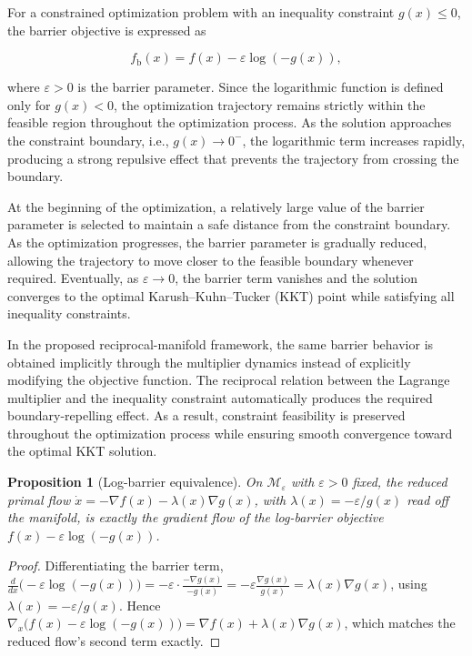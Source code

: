 \documentclass[11pt,onecolumn]{article}
\newtheorem{proposition}[theorem]{Proposition}
\theoremstyle{definition}
\theoremstyle{remark}
\newcommand{\Mveps}{\mathcal{M}_\varepsilon}
\begin{document}
For a constrained optimization problem with an inequality constraint $g(x)\le0$, the barrier objective is expressed as

\begin{equation}
f_{\mathrm{b}}(x)=f(x)-\varepsilon\log\!\left(-g(x)\right),
\label{eq:log_barrier}
\end{equation}

where $\varepsilon>0$ is the barrier parameter. Since the logarithmic function is defined only for $g(x)<0$, the optimization trajectory remains strictly within the feasible region throughout the optimization process. As the solution approaches the constraint boundary, i.e., $g(x)\rightarrow0^{-}$, the logarithmic term increases rapidly, producing a strong repulsive effect that prevents the trajectory from crossing the boundary.

At the beginning of the optimization, a relatively large value of the barrier parameter is selected to maintain a safe distance from the constraint boundary. As the optimization progresses, the barrier parameter is gradually reduced, allowing the trajectory to move closer to the feasible boundary whenever required. Eventually, as $\varepsilon\rightarrow0$, the barrier term vanishes and the solution converges to the optimal Karush--Kuhn--Tucker (KKT) point while satisfying all inequality constraints.

In the proposed reciprocal-manifold framework, the same barrier behavior is obtained implicitly through the multiplier dynamics instead of explicitly modifying the objective function. The reciprocal relation between the Lagrange multiplier and the inequality constraint automatically produces the required boundary-repelling effect. As a result, constraint feasibility is preserved throughout the optimization process while ensuring smooth convergence toward the optimal KKT solution.

\begin{proposition}[Log-barrier equivalence] \label{prop:logbarrier}
On $\Mveps$ with $\varepsilon > 0$ fixed, the reduced primal flow
$\dot x = -\nabla f(x) - \lambda(x) \nabla g(x)$, with $\lambda(x) = -\varepsilon/g(x)$ read off
the manifold, is exactly the gradient flow of the log-barrier objective
$f(x) - \varepsilon \log(-g(x))$.
\end{proposition}

\begin{proof}
Differentiating the barrier term,
$\frac{d}{dx}\big(-\varepsilon \log(-g(x))\big) = -\varepsilon \cdot \frac{-\nabla g(x)}{-g(x)}
= -\varepsilon \frac{\nabla g(x)}{g(x)} = \lambda(x) \nabla g(x)$, using
$\lambda(x) = -\varepsilon/g(x)$. Hence
$\nabla_x\big(f(x) - \varepsilon \log(-g(x))\big) = \nabla f(x) + \lambda(x) \nabla g(x)$,
which matches the reduced flow's second term exactly.
\end{proof}
\end{document}
